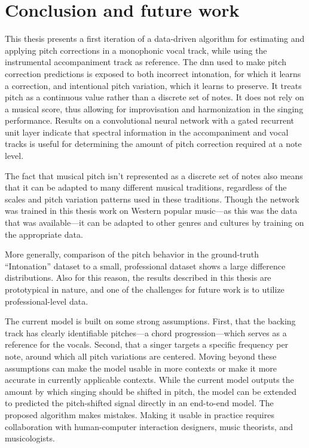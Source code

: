 \chapter{Conclusion and future work}
\label{chap:conclusion}

This thesis presents a first iteration of a data-driven algorithm for estimating and applying pitch corrections in a monophonic vocal track, while using the instrumental accompaniment track as reference. The \gls{dnn} used to make pitch correction predictions is exposed to both incorrect intonation, for which it learns a correction, and intentional pitch variation, which it learns to preserve. It treats pitch as a continuous value rather than a discrete set of notes. It does not rely on a musical score, thus allowing for improvisation and harmonization in the singing performance. Results on a convolutional neural network with a gated recurrent unit layer indicate that spectral information in the accompaniment and vocal tracks is useful for determining the amount of pitch correction required at a note level. 

The fact that musical pitch isn't represented as a discrete set of notes also means that it can be adapted to many different musical traditions, regardless of the scales and pitch variation patterns used in these traditions. Though the network was trained in this thesis work on Western popular music---as this was the data that was available---it can be adapted to other genres and cultures by training on the appropriate data.

More generally, comparison of the pitch behavior in the ground-truth ``Intonation'' dataset to a small, professional dataset shows a large difference distributions. Also for this reason, the results described in this thesis are prototypical in nature, and one of the challenges for future work is to utilize professional-level data. 

The current model is built on some strong assumptions. First, that the backing track has clearly identifiable pitches---a chord progression---which serves as a reference for the vocals. Second, that a singer targets a specific frequency per note, around which all pitch variations are centered. Moving beyond these assumptions can make the model usable in more contexts or make it more accurate in currently applicable contexts. While the current model outputs the amount by which singing should be shifted in pitch, the model can be extended to predicted the pitch-shifted signal directly in an end-to-end model. The proposed algorithm makes mistakes. Making it usable in practice requires collaboration with human-computer interaction designers, music theorists, and musicologists.
